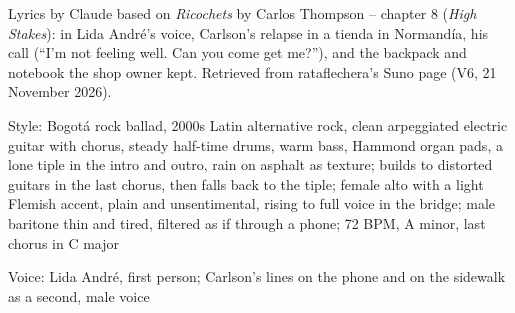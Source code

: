 
\begin{notes}
Lyrics by Claude based on \emph{Ricochets} by Carlos Thompson -- chapter 8 (\emph{High Stakes}): in Lida André's voice, Carlson's relapse in a tienda in Normandía, his call (``I'm not feeling well. Can you come get me?''), and the backpack and notebook the shop owner kept. Retrieved from rataflechera's Suno page (V6, 21 November 2026).
\end{notes}
\begin{style}
Style: Bogotá rock ballad, 2000s Latin alternative rock, clean arpeggiated electric guitar with chorus, steady half-time drums, warm bass, Hammond organ pads, a lone tiple in the intro and outro, rain on asphalt as texture; builds to distorted guitars in the last chorus, then falls back to the tiple; female alto with a light Flemish accent, plain and unsentimental, rising to full voice in the bridge; male baritone thin and tired, filtered as if through a phone; 72 BPM, A minor, last chorus in C major

Voice: Lida André, first person; Carlson's lines on the phone and on the sidewalk as a second, male voice
\end{style}
